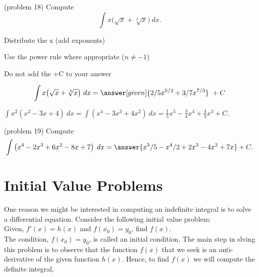 \documentclass{ximera}
\begin{document}
\begin{problem}(problem 18)
Compute
\[
\int x\big(\sqrt x + \sqrt[3] x \big) \ dx.
\]

\begin{hint}
Distribute the x (add exponents)
\end{hint}
\begin{hint}
Use the power rule where appropriate ($n\neq -1$)
\end{hint}
\begin{hint}
\begin{center}
Do not add the +C to your answer
\end{center}
\end{hint}

\[
\int  x\big(\sqrt x + \sqrt[3] x \big) \ dx =
\answer[given]{2/5 x^{5/2} + 3/7 x^{7/3}} \ +  C
\]
\end{problem}


\begin{example}[example 19]
$\int x^2(x^2 - 3x + 4) \ dx = \int (x^4 - 3x^3 + 4x^2) \ dx = \frac15 x^5 - \frac{3}{4}x^4 + \frac43 x^3 + C.$
\end{example}

\begin{problem}(problem 19)
Compute
\[
\int \left(x^4 - 2x^3 + 6x^2 - 8x + 7 \right) \; dx = \answer{ x^5/5 - x^4/2 + 2x^3 - 4x^2 + 7x} + C.
\]
\end{problem}





\section{Initial Value Problems}


One reason we might be interested in computing an indefinite integral is to solve a differential equation. Consider the following initial value problem:\\
Given, $f'(x) = h(x)$ and $f(x_0) = y_0$, find $f(x)$.\\
The condition, $f(x_0) = y_0$, is called an initial condition. The main step in slving this problem is to observe that the function $f(x)$ that we seek is an anti-derivative of the given function $h(x)$. Hence, to find $f(x)$ we will compute the definite integral, 
\end{document}
